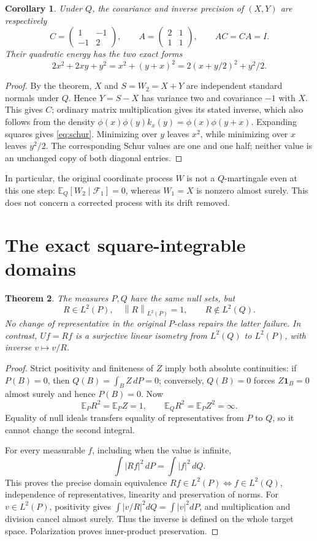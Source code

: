 \documentclass[11pt]{article}
\newtheorem{theorem}{Theorem}[section]
\newtheorem{corollary}[theorem]{Corollary}
\theoremstyle{remark}\newtheorem{remark}[theorem]{Remark}
\newcommand{\E}{\mathbb E}
\newcommand{\F}{\mathcal F}
\newcommand{\norm}[1]{\left\lVert#1\right\rVert}
\begin{document}
\begin{corollary}\label{cor:schur}
Under $Q$, the covariance and inverse precision of $(X,Y)$ are respectively
\[
 C=\begin{pmatrix}1&-1\\-1&2\end{pmatrix},\qquad
 A=\begin{pmatrix}2&1\\1&1\end{pmatrix},\qquad AC=CA=I.
\]
Their quadratic energy has the two exact forms
\begin{equation}\label{eq:schur}
 2x^2+2xy+y^2=x^2+(y+x)^2
 =2(x+y/2)^2+y^2/2.
\end{equation}
\end{corollary}
\begin{proof}
By the theorem, $X$ and $S=W_2=X+Y$ are independent standard normals under $Q$. Hence $Y=S-X$ has variance two and covariance $-1$ with $X$. This gives $C$; ordinary matrix multiplication gives its stated inverse, which also follows from the density
$\phi(x)\phi(y)k_x(y)=\phi(x)\phi(y+x)$. Expanding squares gives \eqref{eq:schur}. Minimizing over $y$ leaves $x^2$, while minimizing over $x$ leaves $y^2/2$. The corresponding Schur values are one and one half; neither value is an unchanged copy of both diagonal entries.
\end{proof}

In particular, the original coordinate process $W$ is not a $Q$-martingale even at this one step: $\E_Q[W_2\mid\F_1]=0$, whereas $W_1=X$ is nonzero almost surely. This does not concern a corrected process with its drift removed.

\section{The exact square-integrable domains}
\begin{theorem}\label{thm:domain}
The measures $P,Q$ have the same null sets, but
\[
 R\in L^2(P),\quad \norm{R}_{L^2(P)}=1,
 \qquad R\notin L^2(Q).
\]
No change of representative in the original $P$-class repairs the latter failure. In contrast, $U f=Rf$ is a surjective linear isometry from $L^2(Q)$ to $L^2(P)$, with inverse $v\mapsto v/R$.
\end{theorem}
\begin{proof}
Strict positivity and finiteness of $Z$ imply both absolute continuities: if $P(B)=0$, then $Q(B)=\int_B Z\,dP=0$; conversely, $Q(B)=0$ forces $Z\mathbf1_B=0$ almost surely and hence $P(B)=0$. Now
\[
 \E_P R^2=\E_P Z=1,\qquad
 \E_Q R^2=\E_P Z^2=\infty.
\]
Equality of null ideals transfers equality of representatives from $P$ to $Q$, so it cannot change the second integral.

For every measurable $f$, including when the value is infinite,
\[
 \int |Rf|^2\,dP=\int |f|^2\,dQ.
\]
This proves the precise domain equivalence $Rf\in L^2(P)\iff f\in L^2(Q)$, independence of representatives, linearity and preservation of norms. For $v\in L^2(P)$, positivity gives
$\int |v/R|^2dQ=\int |v|^2dP$, and multiplication and division cancel almost surely. Thus the inverse is defined on the whole target space. Polarization proves inner-product preservation.
\end{proof}
\end{document}

